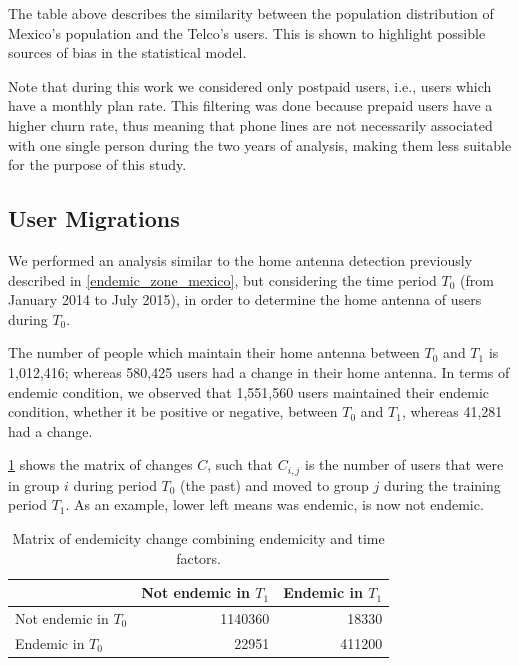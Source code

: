 The table above describes the similarity between the population distribution of Mexico's population and the Telco's users. This is shown to highlight possible sources of bias in the statistical model.

Note that during this work we considered only postpaid users, i.e., users which have a monthly plan rate. This filtering was done because prepaid users have a higher churn rate, thus meaning that phone lines are not necessarily associated with one single person during the two years of analysis, making them less suitable for the purpose of this study.




\subsection{User Migrations}\label{subsection:user_migrations} %

We performed an analysis similar to the home antenna detection previously described in \cref{endemic_zone_mexico},
but considering the time period $T_0$ (from January 2014 to July 2015),
in order to determine the home antenna of users during $T_0$.

The number of people which maintain their home antenna between $T_0$ and $T_1$ is 1,012,416;
whereas 580,425 users had a change in their home antenna.
In terms of endemic condition, we observed that 1,551,560 users maintained their endemic condition, whether it be positive or negative,
between $T_0$ and $T_1$, whereas 41,281 had a change.


%
%
%

\cref{tab:changes}
shows the matrix of changes $C$, such that $C_{i, j}$ is the number of users that were in group $i$ during period $T_0$ (the past) and moved to group $j$ during the training period $T_1$. As an example, lower left means was endemic, is now not endemic.

\begin{table}[ht]
	\caption{Matrix of endemicity change combining endemicity and time factors.}\label{tab:changes}
	\centering
	\begin{tabular}{l r r }
		\toprule
		& Not endemic in $T_1$ & Endemic in $T_1$ \\
		\midrule
		Not endemic in $T_0$ & 1140360 & 18330   \\
		Endemic in $T_0$       & 22951    & 411200 \\
		\bottomrule
	\end{tabular}
\end{table}


